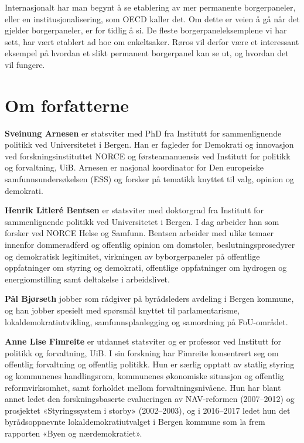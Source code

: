 \documentclass[
  12pt,
  a4paper, 12pt]{article}
\begin{document}
Internasjonalt har man begynt å se etablering av mer permanente borgerpaneler, eller en institusjonalisering, som OECD kaller det. Om dette er veien å gå når det gjelder borgerpaneler, er for tidlig å si. De fleste borgerpaneleksemplene vi har sett, har vært etablert ad hoc om enkeltsaker. Røros vil derfor være et interessant eksempel på hvordan et slikt permanent borgerpanel kan se ut, og hvordan det vil fungere.

\newpage

\hypertarget{om-forfatterne}{%
\section{Om forfatterne}\label{om-forfatterne}}

\textbf{Sveinung Arnesen} er statsviter med PhD fra Institutt for sammenlignende politikk ved Universitetet i Bergen. Han er fagleder for Demokrati og innovasjon ved forskningsinstituttet NORCE og førsteamanuensis ved Institutt for politikk og forvaltning, UiB. Arnesen er nasjonal koordinator for Den europeiske samfunnsundersøkelsen (ESS) og forsker på tematikk knyttet til valg, opinion og demokrati.

\textbf{Henrik Litleré Bentsen} er statsviter med doktorgrad fra Institutt for sammenlignende politikk ved Universitetet i Bergen. I dag arbeider han som forsker ved NORCE Helse og Samfunn. Bentsen arbeider med ulike temaer innenfor dommeradferd og offentlig opinion om domstoler, beslutningsprosedyrer og demokratisk legitimitet, virkningen av byborgerpaneler på offentlige oppfatninger om styring og demokrati, offentlige oppfatninger om hydrogen og energiomstilling samt deltakelse i arbeidslivet.

\textbf{Pål Bjørseth} jobber som rådgiver på byrådsleders avdeling i Bergen kommune, og han jobber spesielt med spørsmål knyttet til parlamentarisme, lokaldemokratiutvikling, samfunnsplanlegging og samordning på FoU-området.

\textbf{Anne Lise Fimreite} er utdannet statsviter og er professor ved Institutt for politikk og forvaltning, UiB. I sin forskning har Fimreite konsentrert seg om offentlig forvaltning og offentlig politikk. Hun er særlig opptatt av statlig styring og kommunenes handlingsrom, kommunenes økonomiske situasjon og offentlig reformvirksomhet, samt forholdet mellom forvaltningsnivåene. Hun har blant annet ledet den forskningsbaserte evalueringen av NAV-reformen (2007--2012) og prosjektet «Styringssystem i storby» (2002--2003), og i 2016--2017 ledet hun det byrådsoppnevnte lokaldemokratiutvalget i Bergen kommune som la frem rapporten «Byen og nærdemokratiet».
\end{document}

